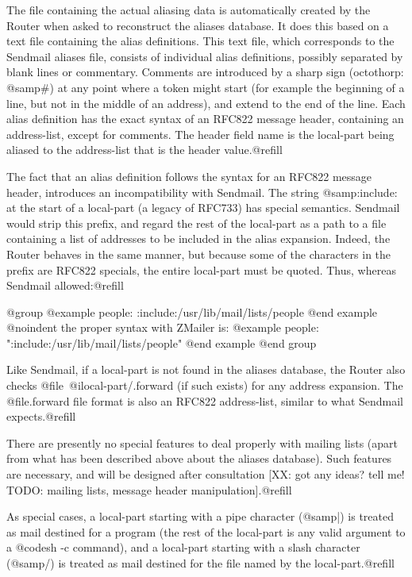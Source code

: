 {{The file containing the actual aliasing data is automatically created by
the Router when asked to reconstruct the aliases database.  It does this
based on a text file containing the alias definitions.  This text file,
which corresponds to the Sendmail aliases file, consists of individual
alias definitions, possibly separated by blank lines or commentary.
Comments are introduced by a sharp sign (octothorp: @samp{#}) at any point where
a token might start (for example the beginning of a line, but not in the
middle of an address), and extend to the end of the line.  Each alias
definition has the exact syntax of an RFC822 message header, containing an
address-list, except for comments.  The header field name is the local-part
being aliased to the address-list that is the header value.@refill

The fact that an alias definition follows the syntax for an RFC822 message
header, introduces an incompatibility with Sendmail.  The string
@samp{:include:} at the start of a local-part (a legacy of RFC733) has
special semantics.  Sendmail would strip this prefix, and regard the rest
of the local-part as a path to a file containing a list of addresses to be
included in the alias expansion.  Indeed, the Router behaves in the same
manner, but because some of the characters in the prefix are RFC822 specials,
the entire local-part must be quoted.  Thus, whereas Sendmail allowed:@refill

@group
@example
people: :include:/usr/lib/mail/lists/people
@end example
@noindent
the proper syntax with ZMailer is:
@example
people: ":include:/usr/lib/mail/lists/people"
@end example
@end group

Like Sendmail, if a local-part is not found in the aliases database, the
Router also checks @file{~@i{local-part}/.forward} (if such exists) for any
address expansion.  The @file{.forward} file format is also an RFC822
address-list, similar to what Sendmail expects.@refill

There are presently no special features to deal properly with mailing lists
(apart from what has been described above about the aliases database).  Such
features are necessary, and will be designed after consultation [XX: got any
ideas? tell me! TODO: mailing lists, message header manipulation].@refill

As special cases, a local-part starting with a pipe character (@samp{|}) is
treated as mail destined for a program (the rest of the local-part is any
valid argument to a @code{sh -c} command), and a local-part starting with a
slash character (@samp{/}) is treated as mail destined for the file named by the
local-part.@refill

}}
